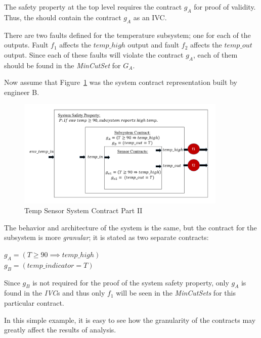 The safety property at the top level requires the contract $g_A$ for proof of validity. Thus, the \aivcalg should contain the contract $g_A$ as an IVC. 

There are two faults defined for the temperature subsystem; one for each of the outputs. Fault $f_1$ affects the $temp\_high$ output and fault $f_2$ affects the $temp\_out$ output. Since each of these faults will violate the contract $g_A$, each of them should be found in the \textit{MinCutSet} for $G_A$.

Now assume that Figure~\ref{fig:granularityEx2} was the system contract representation built by engineer B. 

\begin{figure}[h!]
\begin{center}
\includegraphics[width=10cm]{images/granularityEx2.PNG}
\caption{Temp Sensor System Contract Part II} \label{fig:granularityEx2}
\end{center}
\end{figure} 

The behavior and architecture of the system is the same, but the contract for the subsystem is more \textit{granular}; it is stated as two separate contracts:
\begin{center}
    $ g_A = (T \geq 90 \implies temp\_high)$ \\ 
    $ g_B = (temp\_indicator = T)$ 
\end{center}

Since $g_B$ is not required for the proof of the system safety property, only $g_A$ is found in the \textit{IVC}s and thus only $f_1$ will be seen in the \textit{MinCutSets} for this particular contract. 
 
In this simple example, it is easy to see how the granularity of the contracts may greatly affect the results of analysis.